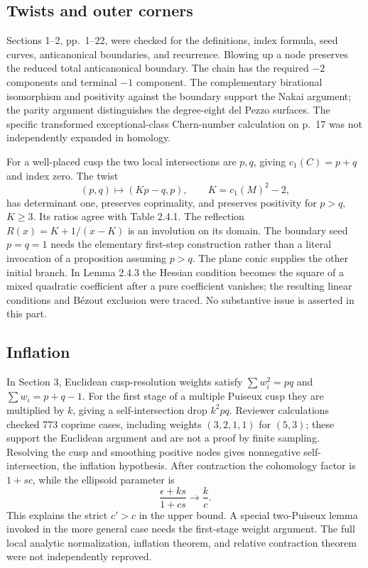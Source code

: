 \documentclass[10pt]{article}
\begin{document}
\subsection*{Twists and outer corners}
Sections 1–2, pp. 1–22, were checked for the definitions, index formula, seed curves, anticanonical boundaries, and recurrence. Blowing up a node preserves the reduced total anticanonical boundary. The chain has the required \(-2\) components and terminal \(-1\) component. The complementary birational isomorphism and positivity against the boundary support the Nakai argument; the parity argument distinguishes the degree-eight del Pezzo surfaces. The specific transformed exceptional-class Chern-number calculation on p. 17 was not independently expanded in homology.\par
For a well-placed cusp the two local intersections are \(p,q\), giving \(c_1(C)=p+q\) and index zero. The twist \[(p,q)\mapsto(Kp-q,p),\qquad K=c_1(M)^2-2,\] has determinant one, preserves coprimality, and preserves positivity for \(p>q\), \(K\geq3\). Its ratios agree with Table 2.4.1. The reflection \(R(x)=K+1/(x-K)\) is an involution on its domain. The boundary seed \(p=q=1\) needs the elementary first-step construction rather than a literal invocation of a proposition assuming \(p>q\). The plane conic supplies the other initial branch. In Lemma 2.4.3 the Hessian condition becomes the square of a mixed quadratic coefficient after a pure coefficient vanishes; the resulting linear conditions and Bézout exclusion were traced. No substantive issue is asserted in this part.\par
\subsection*{Inflation}
In Section 3, Euclidean cusp-resolution weights satisfy \(\sum w_i^2=pq\) and \(\sum w_i=p+q-1\). For the first stage of a multiple Puiseux cusp they are multiplied by \(k\), giving a self-intersection drop \(k^2pq\). Reviewer calculations checked 773 coprime cases, including weights \((3,2,1,1)\) for \((5,3)\); these support the Euclidean argument and are not a proof by finite sampling. Resolving the cusp and smoothing positive nodes gives nonnegative self-intersection, the inflation hypothesis. After contraction the cohomology factor is \(1+sc\), while the ellipsoid parameter is \[\frac{\epsilon+ks}{1+cs}\longrightarrow\frac{k}{c}.\] This explains the strict \(c'>c\) in the upper bound. A special two-Puiseux lemma invoked in the more general case needs the first-stage weight argument. The full local analytic normalization, inflation theorem, and relative contraction theorem were not independently reproved.\par
\end{document}
